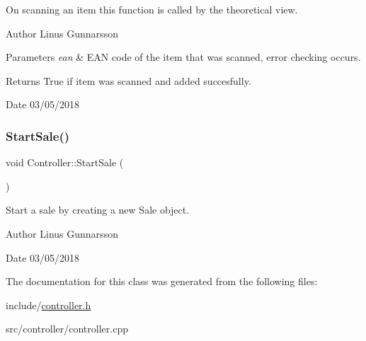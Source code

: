 On scanning an item this function is called by the theoretical \textquotesingle{}view\textquotesingle{}. \begin{DoxyAuthor}{Author}
Linus Gunnarsson 
\end{DoxyAuthor}

\begin{DoxyParams}{Parameters}
{\em ean} & E\+AN code of the item that was scanned, error checking occurs. \\
\hline
\end{DoxyParams}
\begin{DoxyReturn}{Returns}
True if item was scanned and added succesfully. 
\end{DoxyReturn}
\begin{DoxyDate}{Date}
03/05/2018 
\end{DoxyDate}
\mbox{\label{classController_a0a9b1a04843990d5692b4af126b21efd}} 
\subsubsection{\texorpdfstring{Start\+Sale()}{StartSale()}}
{\footnotesize\ttfamily void Controller\+::\+Start\+Sale (\begin{DoxyParamCaption}{ }\end{DoxyParamCaption})}

Start a sale by creating a new Sale object. \begin{DoxyAuthor}{Author}
Linus Gunnarsson 
\end{DoxyAuthor}
\begin{DoxyDate}{Date}
03/05/2018 
\end{DoxyDate}


The documentation for this class was generated from the following files\+:\begin{DoxyCompactItemize}
\item 
include/\mbox{\hyperlink{controller_8h}{controller.\+h}}\item 
src/controller/controller.\+cpp\end{DoxyCompactItemize}
